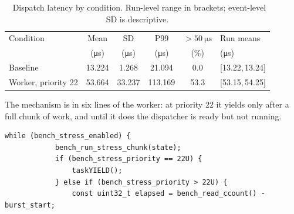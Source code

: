 \begin{table}[htbp]
\centering
\caption{\evM\ Dispatch latency by condition. Run-level range in brackets; event-level SD is descriptive.}
\label{tab:lat}
\begin{tabular}{l S[table-format=2.3] S[table-format=2.3] S[table-format=3.3] S[table-format=2.1] l}
\toprule
Condition & {Mean} & {SD} & {P99} & {$>\SI{50}{\micro\second}$} & Run means \\
          & {(\si{\micro\second})} & {(\si{\micro\second})} & {(\si{\micro\second})} & {(\si{\percent})} & (\si{\micro\second}) \\
\midrule
Baseline            & 13.224 & 1.268 & 21.094 & 0.0  & [13.22,\,13.24] \\
Worker, priority 22 & 53.664 & 33.237 & 113.169 & 53.3 & [53.15,\,54.25] \\
\bottomrule
\end{tabular}
\end{table}

The mechanism is in six lines of the worker: at priority 22 it yields only after a full chunk of
work, and until it does the dispatcher is ready but not running.
\begin{lstlisting}[style=fw, firstnumber=856, title={\lsttitle{esp32\_benchmark\_logged.ino}{856--861}}]
        while (bench_stress_enabled) {
            bench_run_stress_chunk(state);
            if (bench_stress_priority == 22U) {
                taskYIELD();
            } else if (bench_stress_priority > 22U) {
                const uint32_t elapsed = bench_read_ccount() - burst_start;
\end{lstlisting}
